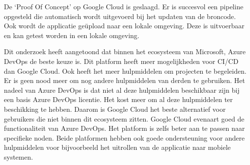 De ‘Proof Of Concept’ op Google Cloud is geslaagd. Er is succesvol een pipeline opgesteld die automatisch wordt uitgevoerd bij het updaten van de broncode. Ook wordt de applicatie geüpload naar een lokale omgeving. Deze is uitvoerbaar en kan getest worden in een lokale omgeving.

Dit onderzoek heeft aangetoond dat binnen het ecosysteem van Microsoft, Azure DevOps de beste keuze is. Dit platform heeft meer mogelijkheden voor CI/CD dan Google Cloud. Ook heeft het meer hulpmiddelen om projecten te begeleiden. Er is geen nood meer om nog andere hulpmiddelen van derden te gebruiken. Het nadeel van Azure DevOps is dat niet al deze hulpmiddelen beschikbaar zijn bij een basis Azure DevOps licentie. Het kost meer om al deze hulpmiddelen ter beschikking te hebben. Daarom is Google Cloud het beste alternatief voor gebruikers die niet binnen dit ecosysteem zitten. Google Cloud evenaart goed de functionaliteit van Azure DevOps. Het platform is zelfs beter aan te passen naar specifieke noden. Beide platformen hebben ook goede ondersteuning voor andere hulpmiddelen voor bijvoorbeeld het uitrollen van de applicatie naar mobiele systemen.


